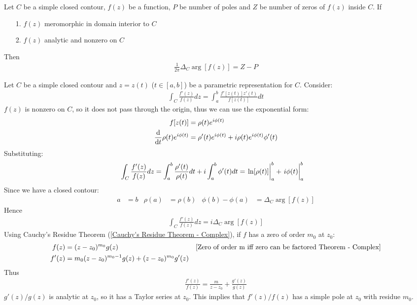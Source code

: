 \documentclass[12pt, english]{book}
\makeatletter
\renewenvironment{proof}[1][\proofname]{\par
	\pushQED{\qed}%
	\normalfont \topsep6\p@\@plus6\p@\relax
	\list{}{%
		\settowidth{\leftmargin}{\itshape\proofname:\hskip\labelsep}%
		\setlength{\labelwidth}{0pt}%
		\setlength{\itemindent}{-\leftmargin}%
	}%
	\item[\hskip\labelsep\itshape#1\@addpunct{:}]\ignorespaces
	}{ \popQED\endlist\@endpefalse}
\makeatother
\begin{document}
	\begin{theorem}
		\label{Argument Principle Theorem - Complex}
		Let \(C\) be a simple closed contour, \(f(z)\) be a function, \(P\) be number of poles and \(Z\) be number of zeros of \(f(z)\) inside \(C\). If
		\begin{itemize}
			\item[1.] \(f(z)\) meromorphic in domain interior to \(C\)
			\item[2.] \(f(z)\) analytic and nonzero on \(C\)
		\end{itemize}
		Then 
		\begin{align*}
			\frac{1}{2\pi} \Delta_C \arg[f(z)] = Z - P
		\end{align*}
	\end{theorem}
	\begin{proof}
		Let \(C\) be a simple closed contour and \(z = z(t)\) (\(t \in [a, b]\)) be a parametric representation for \(C\). Consider:
		\begin{align*}
			\int_C \frac{f'(z)}{f(z)} dz = \int_{a}^{b} \frac{f'[z(t)] z'(t)}{f[z(t)]} dt
		\end{align*}
		\(f(z)\) is nonzero on \(C\), so it does not pass through the origin, thus we can use the exponential form:
		\begin{align*}
			f[z(t)] &= \rho(t) e^{i\phi(t)} \\
			\dv{t} \rho(t) e^{i\phi(t)} &= \rho'(t) e^{i\phi(t)} + i\rho(t)e^{i\phi(t)} \phi'(t)
		\end{align*}
		Substituting:
		\begin{align*}
			\int_C \frac{f'(z)}{f(z)} dz 
			&= \int_{a}^{b} \frac{\rho'(t)}{\rho(t)} dt + i\int_{a}^{b} \phi'(t) dt 
			= \eval{\ln[\rho(t)]}_{a}^{b} + \eval{i\phi(t)}_{a}^{b}
		\end{align*}
		Since we have a closed contour:
		\begin{align*}
			a&=b & \rho(a) &= \rho(b) & \phi(b) - \phi(a) &= \Delta_C \arg[f(z)]
		\end{align*}
		Hence
		\begin{align*}
			\int_{C} \frac{f'(z)}{f(z)} dz = i\Delta_{C} \arg[f(z)]
		\end{align*}
		Using Cauchy's Residue Theorem (\cref{Cauchy's Residue Theorem - Complex}), if \(f\) has a zero of order \(m_0\) at \(z_0\):
		\begin{align*}
			f(z) &= (z-z_0)^{m_0} g(z) 
				& \text{\Cref{Zero of order m iff zero can be factored Theorem - Complex}} \\
			f'(z) &= m_0 (z-z_0)^{m_0 - 1} g(z) + (z-z_0)^{m_0} g'(z)
		\end{align*}
		Thus
		\begin{align*}
			\frac{f'(z)}{f(z)} = \frac{m}{z-z_0} + \frac{g'(z)}{g(z)}
		\end{align*}
		\(g'(z)/g(z)\) is analytic at \(z_0\), so it has a Taylor series at \(z_0\). This implies that \(f'(z)/f(z)\) has a simple pole at \(z_0\) with residue \(m_0\).
		

\end{proof}
\end{document}
